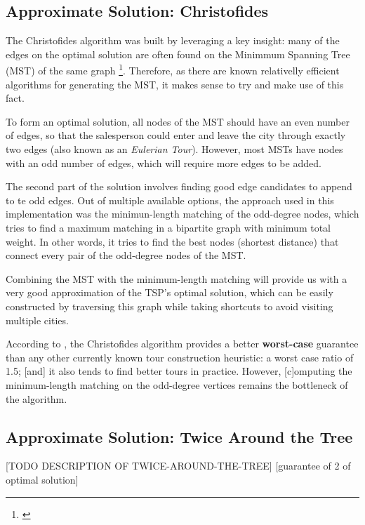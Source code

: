 \documentclass[12pt]{article}
\begin{document}
\subsection{Approximate Solution: Christofides} \label{sec:chris_explanation}

The Christofides algorithm was built by leveraging a key insight: many of the edges on the 
optimal solution are often found on the Minimmum Spanning Tree (MST) of the same graph 
\footnote{\cite{reducible_explanation}}. Therefore, as there are known relativelly efficient 
algorithms for generating the MST, it makes sense to try and make use of this fact.

To form an optimal solution, all nodes of the MST should have an even number of edges, so 
that the salesperson could enter and leave the city through exactly two edges (also known as an 
\textit{Eulerian Tour}). However, most MSTs have nodes with an odd number of edges, 
which will require more edges to be added.

The second part of the solution involves finding good edge candidates to append to te odd 
edges. Out of multiple available options, the approach used in this implementation was the minimun-length
matching of the odd-degree nodes, which tries to find a maximum matching in a bipartite 
graph with minimum total weight. In other words, it tries to find the best nodes (shortest distance) 
that connect every pair of the odd-degree nodes of the MST.

Combining the MST with the minimum-length matching will provide us with a very good 
approximation of the TSP's optimal solution, which can be easily constructed by
traversing this graph while taking shortcuts to avoid visiting multiple cities.

According to \cite{Johnson2003}, the Christofides algorithm provides a better 
\textbf{worst-case} guarantee than any other currently known tour construction heuristic: a worst case ratio of 1.5; 
[and] it also tends to find better tours in practice. However, [c]omputing the minimum-length 
matching on the odd-degree vertices remains the bottleneck of the algorithm.

\subsection{Approximate Solution: Twice Around the Tree} \label{sec:twice_explanation}

[TODO DESCRIPTION OF TWICE-AROUND-THE-TREE]
[guarantee of 2 of optimal solution]
\end{document}
